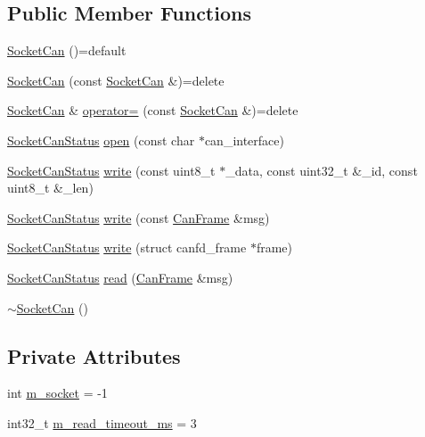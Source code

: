 \subsection*{Public Member Functions}
\begin{DoxyCompactItemize}
\item 
\hyperlink{classscpp_1_1SocketCan_ac8947ab71c8ebf46f0bd0e7a3bd0e97a}{Socket\+Can} ()=default
\item 
\hyperlink{classscpp_1_1SocketCan_a837269bf5bc7edefb6ad17840ae3d867}{Socket\+Can} (const \hyperlink{classscpp_1_1SocketCan}{Socket\+Can} \&)=delete
\item 
\hyperlink{classscpp_1_1SocketCan}{Socket\+Can} \& \hyperlink{classscpp_1_1SocketCan_a474c925b2fb96b40a5cc549ba8134a44}{operator=} (const \hyperlink{classscpp_1_1SocketCan}{Socket\+Can} \&)=delete
\item 
\hyperlink{namespacescpp_abc60b9ed5f90c311397500d39ff15ef2}{Socket\+Can\+Status} \hyperlink{classscpp_1_1SocketCan_aa1ff7b90193c5beee33947a59c2e63bc}{open} (const char $\ast$can\+\_\+interface)
\item 
\hyperlink{namespacescpp_abc60b9ed5f90c311397500d39ff15ef2}{Socket\+Can\+Status} \hyperlink{classscpp_1_1SocketCan_af0e968a352380922dcde307e73b76f12}{write} (const uint8\+\_\+t $\ast$\+\_\+data, const uint32\+\_\+t \&\+\_\+id, const uint8\+\_\+t \&\+\_\+len)
\item 
\hyperlink{namespacescpp_abc60b9ed5f90c311397500d39ff15ef2}{Socket\+Can\+Status} \hyperlink{classscpp_1_1SocketCan_a323054409494c177ac8a5522d760c012}{write} (const \hyperlink{structscpp_1_1CanFrame}{Can\+Frame} \&msg)
\item 
\hyperlink{namespacescpp_abc60b9ed5f90c311397500d39ff15ef2}{Socket\+Can\+Status} \hyperlink{classscpp_1_1SocketCan_a3e4e4ca4931587c466801e01183942f4}{write} (struct canfd\+\_\+frame $\ast$frame)
\item 
\hyperlink{namespacescpp_abc60b9ed5f90c311397500d39ff15ef2}{Socket\+Can\+Status} \hyperlink{classscpp_1_1SocketCan_aa104c900d3e10722e3c1326c1322ee91}{read} (\hyperlink{structscpp_1_1CanFrame}{Can\+Frame} \&msg)
\item 
\hyperlink{classscpp_1_1SocketCan_abefe3a6fcbf0de1bf505d123eed9008e}{$\sim$\+Socket\+Can} ()
\end{DoxyCompactItemize}
\subsection*{Private Attributes}
\begin{DoxyCompactItemize}
\item 
int \hyperlink{classscpp_1_1SocketCan_a5a69eb3524f4dcc15bff5080934d60c8}{m\+\_\+socket} = -\/1
\item 
int32\+\_\+t \hyperlink{classscpp_1_1SocketCan_aa4d51fc60ada0d6ce29c112adedad63b}{m\+\_\+read\+\_\+timeout\+\_\+ms} = 3
\end{DoxyCompactItemize}


